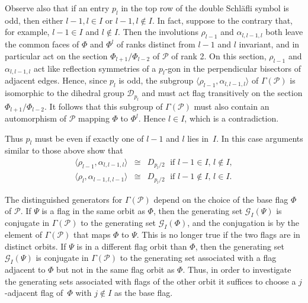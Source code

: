 \documentclass[12pt]{article}
\renewcommand{\>}{\rangle}
\theoremstyle{definition}\newtheorem{definition}{Definition}[section]
\begin{document}
Observe also that if an entry $p_l$ in the top row of the double Schl\"afli symbol is odd, then either $l-1, l \in I$ or $l-1, l \notin I$. In fact, suppose to the contrary that, for example, $l-1 \in I$ and $l \notin I$. Then the involutions $\rho_{l-1}$ and $\alpha_{l, l-1, l}$ both leave the common faces of $\Phi$ and $\Phi^l$ of ranks distinct from $l-1$ and $l$ invariant, and in particular act on the section $\Phi_{l+1} / \Phi_{l-2}$ of $\mathcal{P}$ of rank 2. On this section, $\rho_{l-1}$ and $\alpha_{l, l-1, l}$ act like reflection symmetries of a $p_l$-gon in the perpendicular bisectors of adjacent edges. Hence, since $p_l$ is odd, the subgroup $\langle \rho_{l-1}, \alpha_{l, l-1, l} \rangle$ of $\Gamma(\mathcal{P})$ is isomorphic to the dihedral group $\mathcal{D}_{p_l}$ and must act flag transitively on the section $\Phi_{l+1} / \Phi_{l-2}$. It follows that this subgroup of $\Gamma(\mathcal{P})$ must also contain an automorphism of $\mathcal{P}$ mapping $\Phi$ to $\Phi^{l}$. Hence $l \in I$, which is a contradiction. 

Thus $p_l$ must be even if exactly one of $l-1$ and $l$ lies in~$I$. In this case arguments similar to those above show that 
\begin{equation}
\label{radih}
\begin{array}{rcl}
\langle\rho_{l-1},\alpha_{l,l-1,l}\rangle\!\! &\cong&\!\! D_{p_{l}/2} \;\mbox{ if } l-1\in I,\, l\notin I, \\[.04in]
\langle\rho_{l},\alpha_{l-1,l,l-1}\rangle\!\! &\cong&\!\! D_{p_{l}/2} \;\mbox{ if } l-1\notin I,\, l\in I .
\end{array}
\end{equation}
\smallskip

The distinguished generators for $\Gamma(\mathcal{P})$ depend on the choice of the base flag $\Phi$ of $\mathcal{P}$. If $\Psi$ is a flag in the same orbit as $\Phi$, then the generating set $\mathcal{G}_{I}(\Psi)$ is conjugate in $\Gamma(\mathcal{P})$ to the generating set $\mathcal{G}_{I}(\Phi)$, and the conjugation is by the element of $\Gamma(\mathcal{P})$ that maps $\Phi$ to $\Psi$. This is no longer true if the two flags are in distinct orbits. If $\Psi$ is in a different flag orbit than $\Phi$, then the generating set $\mathcal{G}_{I}(\Psi)$ is conjugate in $\Gamma(\mathcal{P})$ to the generating set associated with a flag adjacent to $\Phi$ but not in the same flag orbit as $\Phi$. Thus, in order to investigate the generating sets associated with flags of the other orbit it suffices to choose a $j$-adjacent flag of~$\Phi$ with $j\notin I$ as the base flag. 
\end{document}
